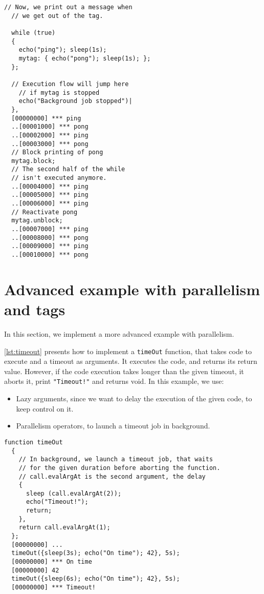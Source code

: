 \documentclass[openright,twoside,12pt]{report}
\begin{document}
\begin{lstlisting}[caption=Blocking chunks of code, label=lst:block]
  // Now, we print out a message when
  // we get out of the tag.

  while (true)
  {
    echo("ping"); sleep(1s);
    mytag: { echo("pong"); sleep(1s); };
  };

  // Execution flow will jump here
    // if mytag is stopped
    echo("Background job stopped")|
  },
  [00000000] *** ping
  ..[00001000] *** pong
  ..[00002000] *** ping
  ..[00003000] *** pong
  // Block printing of pong
  mytag.block;
  // The second half of the while
  // isn't executed anymore.
  ..[00004000] *** ping
  ..[00005000] *** ping
  ..[00006000] *** ping
  // Reactivate pong
  mytag.unblock;
  ..[00007000] *** ping
  ..[00008000] *** pong
  ..[00009000] *** ping
  ..[00010000] *** pong
\end{lstlisting}

\section{Advanced example with parallelism and tags}

In this section, we implement a more advanced example with
parallelism.

\autoref{lst:timeout} presents how to implement a \texttt{timeOut} function,
that takes code to execute and a timeout as arguments. It executes the
code, and returns its return value. However, if the code execution
takes longer than the given timeout, it aborts it, print
\lstinline|"Timeout!"| and returns void. In this example, we use:

\begin{itemize}
\item Lazy arguments, since we want to delay the execution of the
  given code, to keep control on it.
\item Parallelism operators, to launch a timeout job in background.
\end{itemize}

\begin{lstlisting}[caption=Implementing a timeout method, label=lst:timeout]
  function timeOut
  {
    // In background, we launch a timeout job, that waits
    // for the given duration before aborting the function.
    // call.evalArgAt is the second argument, the delay
    {
      sleep (call.evalArgAt(2));
      echo("Timeout!");
      return;
    },
    return call.evalArgAt(1);
  };
  [00000000] ...
  timeOut({sleep(3s); echo("On time"); 42}, 5s);
  [00000000] *** On time
  [00000000] 42
  timeOut({sleep(6s); echo("On time"); 42}, 5s);
  [00000000] *** Timeout!
\end{lstlisting}
\end{document}
